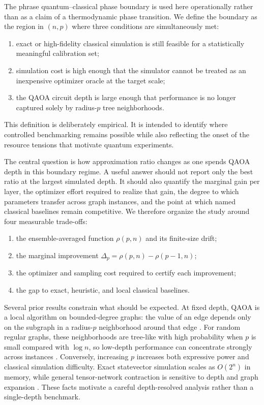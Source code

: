 \documentclass[reprint,aps,longbibliography]{revtex4-2}
\begin{document}
The phrase quantum--classical phase boundary is used here operationally rather than as a claim of a thermodynamic phase transition. We define the boundary as the region in $(n,p)$ where three conditions are simultaneously met:
\begin{enumerate}[label=(\roman*)]
\item exact or high-fidelity classical simulation is still feasible for a statistically meaningful calibration set;
\item simulation cost is high enough that the simulator cannot be treated as an inexpensive optimizer oracle at the target scale;
\item the QAOA circuit depth is large enough that performance is no longer captured solely by radius-$p$ tree neighborhoods.
\end{enumerate}
This definition is deliberately empirical. It is intended to identify where controlled benchmarking remains possible while also reflecting the onset of the resource tensions that motivate quantum experiments.

The central question is how approximation ratio changes as one spends QAOA depth in this boundary regime. A useful answer should not report only the best ratio at the largest simulated depth. It should also quantify the marginal gain per layer, the optimizer effort required to realize that gain, the degree to which parameters transfer across graph instances, and the point at which named classical baselines remain competitive. We therefore organize the study around four measurable trade-offs:
\begin{enumerate}[label=(\roman*)]
\item the ensemble-averaged function $\rho(p,n)$ and its finite-size drift;
\item the marginal improvement $\Delta_p=\rho(p,n)-\rho(p-1,n)$;
\item the optimizer and sampling cost required to certify each improvement;
\item the gap to exact, heuristic, and local classical baselines.
\end{enumerate}

Several prior results constrain what should be expected. At fixed depth, QAOA is a local algorithm on bounded-degree graphs: the value of an edge depends only on the subgraph in a radius-$p$ neighborhood around that edge \cite{Farhi2014QAOA,Brandao2022LocalAlgorithms}. For random regular graphs, these neighborhoods are tree-like with high probability when $p$ is small compared with $\log n$, so low-depth performance can concentrate strongly across instances \cite{Wormald1999RandomRegular,Dembo2017MaxCutRandomRegular}. Conversely, increasing $p$ increases both expressive power and classical simulation difficulty. Exact statevector simulation scales as $O(2^n)$ in memory, while general tensor-network contraction is sensitive to depth and graph expansion \cite{Markov2008Simulation,Gray2021HyperOptimizedContraction}. These facts motivate a careful depth-resolved analysis rather than a single-depth benchmark.
\end{document}

